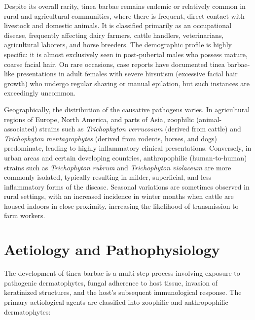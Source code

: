 Despite its overall rarity, tinea barbae remains endemic or relatively common in rural and agricultural communities, where there is frequent, direct contact with livestock and domestic animals. It is classified primarily as an occupational disease, frequently affecting dairy farmers, cattle handlers, veterinarians, agricultural laborers, and horse breeders. The demographic profile is highly specific: it is almost exclusively seen in post-pubertal males who possess mature, coarse facial hair. On rare occasions, case reports have documented tinea barbae-like presentations in adult females with severe hirsutism (excessive facial hair growth) who undergo regular shaving or manual epilation, but such instances are exceedingly uncommon.

Geographically, the distribution of the causative pathogens varies. In agricultural regions of Europe, North America, and parts of Asia, zoophilic (animal-associated) strains such as \textit{Trichophyton verrucosum} (derived from cattle) and \textit{Trichophyton mentagrophytes} (derived from rodents, horses, and dogs) predominate, leading to highly inflammatory clinical presentations. Conversely, in urban areas and certain developing countries, anthropophilic (human-to-human) strains such as \textit{Trichophyton rubrum} and \textit{Trichophyton violaceum} are more commonly isolated, typically resulting in milder, superficial, and less inflammatory forms of the disease. Seasonal variations are sometimes observed in rural settings, with an increased incidence in winter months when cattle are housed indoors in close proximity, increasing the likelihood of transmission to farm workers.

\section*{Aetiology and Pathophysiology}
The development of tinea barbae is a multi-step process involving exposure to pathogenic dermatophytes, fungal adherence to host tissue, invasion of keratinized structures, and the host's subsequent immunological response. The primary aetiological agents are classified into zoophilic and anthropophilic dermatophytes:

